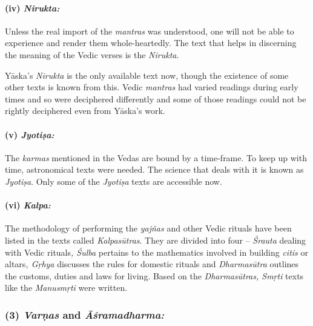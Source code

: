 \paragraph*{(iv) \textit{Nirukta:}}

\vskip -7.3pt

Unless the real import of the \textit{mantras} was understood, one will not be able to experience and render them whole-heartedly. The text that helps in discerning the meaning of the Vedic verses is the \textit{Nirukta}.

Yāska’s \textit{Nirukta} is the only available text now, though the existence of some other texts is known from this. Vedic \textit{mantras} had varied readings during early times and so were deciphered differently and some of those readings could not be rightly deciphered even from Yāska’s work.


\paragraph*{(v) \textit{Jyotiṣa:}}

\vskip -7.3pt

The \textit{karmas} mentioned in the Vedas are bound by a time-frame. To keep up with time, astronomical texts were needed. The science that deals with it is known as \textit{Jyotiṣa}. Only some of the \textit{Jyotiṣa} texts are accessible now.


\paragraph*{(vi) \textit{Kalpa:}}

\vskip -7.3pt

The methodology of performing the \textit{yajñas} and other Vedic rituals have been listed in the texts called \textit{Kalpasūtras}. They are divided into four – \textit{Śrauta} dealing with Vedic rituals\textit{, Śulba} pertains to the mathematics involved in building \textit{citis} or altars\textit{, Gṛhya} discusses the rules for domestic rituals and \textit{Dharmasūtra} outlines the customs, duties and laws for living. Based on the \textit{Dharmasūtras, Smṛti} texts like the \textit{Manusmṛti} were written.


\subsubsection*{(3) \textit{Varṇas} and \textit{Āśramadharma:}}

\vskip -7pt

